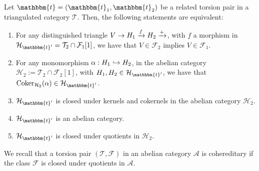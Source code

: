 \begin{corollary}
  Let $\mathbbm{t}=(\mathbbm{t}_1,\mathbbm{t}_2)$ be a related torsion pair in a triangulated category
  $\mathcal{T}$. Then, the following statements are equivalent:
  \begin{enumerate}[label=(\alph*)]
    \item For any distinguished triangle $V\to H_1\xrightarrow{f}H_2\xrightarrow{+}$, with
    $f$ a morphism in $\mathcal{H}_{\mathbbm{t}'}=\mathcal{T}_2\cap\mathcal{F}_1[1]$,
    we have that $V\in\mathcal{F}_2$ implies $V\in\mathcal{F}_1$.
    \item For any monomorphism $\alpha:H_1\hookrightarrow H_2$, in the abelian category
    $\mathcal{H}_2:=\mathcal{T}_2\cap\mathcal{F}_2[1]$, with $H_1,H_2\in\mathcal{H}_{\mathbbm{t}'}$,
    we have that $\Coker_{\mathcal{H}_2}(\alpha)\in\mathcal{H}_{\mathbbm{t}'}$.
    \item $\mathcal{H}_{\mathbbm{t}'}$ is closed under kernels and cokernels in
    the abelian category $\mathcal{H}_2$.
    \item $\mathcal{H}_{\mathbbm{t}'}$ is an abelian category.
    \item $\mathcal{H}_{\mathbbm{t}'}$ is closed under quotients in $\mathcal{H}_2$.
  \end{enumerate}
\end{corollary}

We recall that a torsion pair $(\mathcal{T},\mathcal{F})$ in an abelian category
$\mathcal{A}$ is cohereditary if the class $\mathcal{F}$ is closed under quotients
in $\mathcal{A}$.

